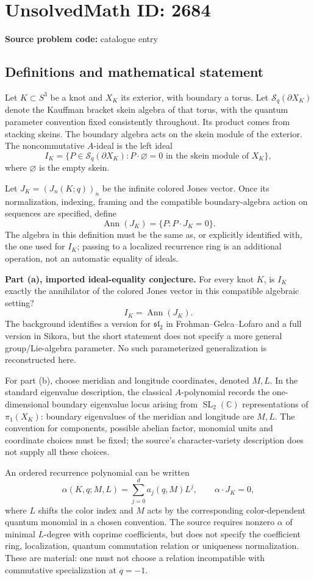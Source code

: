 \documentclass[11pt]{article}
\newcommand{\C}{\mathbb{C}}
\begin{document}
\section*{UnsolvedMath ID: 2684}
\textbf{Source problem code:} catalogue entry
\subsection{Definitions and mathematical statement}
Let $K\subset S^3$ be a knot and $X_K$ its exterior, with boundary a torus. Let $\mathcal S_q(\partial X_K)$ denote the Kauffman bracket skein algebra of that torus, with the quantum parameter convention fixed consistently throughout. Its product comes from stacking skeins. The boundary algebra acts on the skein module of the exterior. The noncommutative $A$-ideal is the left ideal
\[
 I_K=\{P\in\mathcal S_q(\partial X_K):P\cdot\varnothing=0
 \text{ in the skein module of }X_K\},
\]
where $\varnothing$ is the empty skein.

Let $J_K=(J_n(K;q))_n$ be the infinite colored Jones vector. Once its normalization, indexing, framing and the compatible boundary-algebra action on sequences are specified, define
\[
 \operatorname{Ann}(J_K)=\{P:P\cdot J_K=0\}.
\]
The algebra in this definition must be the same as, or explicitly identified with, the one used for $I_K$; passing to a localized recurrence ring is an additional operation, not an automatic equality of ideals.

\textbf{Part (a), imported ideal-equality conjecture.} For every knot $K$, is $I_K$ exactly the annihilator of the colored Jones vector in this compatible algebraic setting?
\[
 I_K=\operatorname{Ann}(J_K).
\]
The background identifies a version for $\mathfrak{sl}_2$ in Frohman--Gelca--Lofaro and a full version in Sikora, but the short statement does not specify a more general group/Lie-algebra parameter. No such parameterized generalization is reconstructed here.

For part (b), choose meridian and longitude coordinates, denoted $M,L$. In the standard eigenvalue description, the classical $A$-polynomial records the one-dimensional boundary eigenvalue locus arising from $\operatorname{SL}_2(\C)$ representations of $\pi_1(X_K)$: boundary eigenvalues of the meridian and longitude are $M,L$. The convention for components, possible abelian factor, monomial units and coordinate choices must be fixed; the source's character-variety description does not supply all these choices.

An ordered recurrence polynomial can be written
\[
 \alpha(K,q;M,L)=\sum_{j=0}^{d}a_j(q,M)L^j,
 \qquad\alpha\cdot J_K=0,
\]
where $L$ shifts the color index and $M$ acts by the corresponding color-dependent quantum monomial in a chosen convention. The source requires nonzero $\alpha$ of minimal $L$-degree with coprime coefficients, but does not specify the coefficient ring, localization, quantum commutation relation or uniqueness normalization. These are material: one must not choose a relation incompatible with commutative specialization at $q=-1$.
\end{document}
